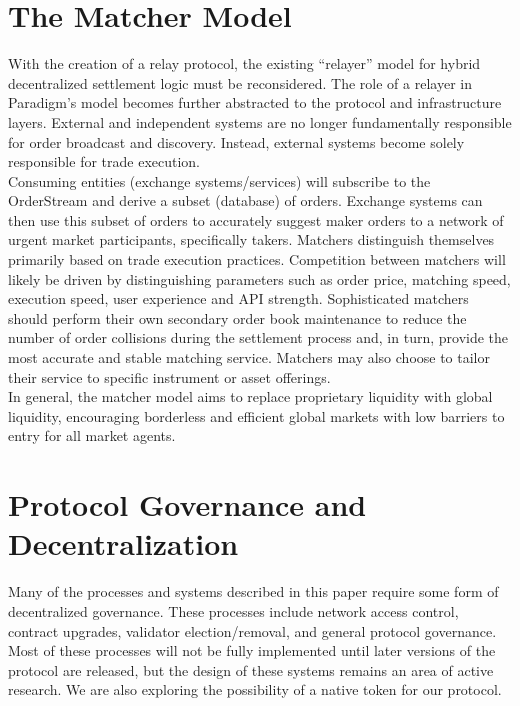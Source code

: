 \documentclass[9pt]{article}
\begin{document}
\clearpage
\pagebreak


\section{The Matcher Model}\label{matcher model}
\noindent With the creation of a relay protocol, the existing “relayer” model for hybrid decentralized settlement logic must be reconsidered. The role of a relayer in Paradigm’s model becomes further abstracted to the protocol and infrastructure layers. External and independent systems are no longer fundamentally responsible for order broadcast and discovery. Instead, external systems become solely responsible for trade execution. \\
 
\noindent Consuming entities (exchange systems/services) will subscribe to the OrderStream and derive a subset (database) of orders. Exchange systems can then use this subset of orders to accurately suggest maker orders to a network of urgent market participants, specifically takers. Matchers distinguish themselves primarily based on trade execution practices. Competition between matchers will likely be driven by distinguishing parameters such as order price, matching speed, execution speed, user experience and API strength. Sophisticated matchers should perform their own secondary order book maintenance to reduce the number of order collisions during the settlement process and, in turn, provide the most accurate and stable matching service. Matchers may also choose to tailor their service to specific instrument or asset offerings. \\ 

\noindent In general, the matcher model aims to replace proprietary liquidity with global liquidity, encouraging borderless and efficient global markets with low barriers to entry for all market agents.

\clearpage
\pagebreak


\section{Protocol Governance and Decentralization}\label{governance}
\noindent Many of the processes and systems described in this paper require some form of decentralized governance. These processes include network access control, contract upgrades, validator election/removal, and general protocol governance. Most of these processes will not be fully implemented until later versions of the protocol are released, but the design of these systems remains an area of active research. We are also exploring the possibility of a native token for our protocol. \\ 
\end{document}
